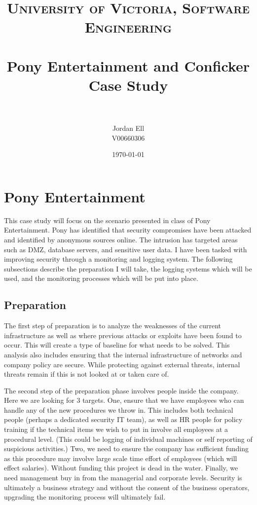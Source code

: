 \documentclass[paper=a4, fontsize=11pt]{scrartcl} %
\title{	
\normalfont \normalsize 
\textsc{University of Victoria, Software Engineering} \\ [25pt] %
\horrule{0.5pt} \\[0.4cm] %
\huge Pony Entertainment and Conficker Case Study \\ %
\horrule{2pt} \\[0.5cm] %
}
\author{Jordan Ell \\ V00660306} %
\date{\normalsize\today} %
\numberwithin{equation}{section} %
\numberwithin{figure}{section} %
\numberwithin{table}{section} %
\begin{document}
\maketitle %


\section{Pony Entertainment}
This case study will focus on the scenario presented in class of Pony Entertainment. Pony
has identified that security compromises have been attacked and identified by anonymous
sources online. The intrusion has targeted areas such as DMZ, database servers, and
sensitive user data. I have been tasked with improving security through a monitoring and
logging system. The following subsections describe the preparation I will take, the
logging systems which will be used, and the monitoring processes which will be put into
place.


\subsection{Preparation}
The first step of preparation is to analyze the weaknesses of the current infrastructure
as well as where previous attacks or exploits have been found to occur. This will create
a type of baseline for what needs to be solved. This analysis also includes ensuring
that the internal infrastructure of networks and company policy are secure. While
protecting against external threats, internal threats remain if this is not looked at
or taken care of.

The second step of the preparation phase involves people inside the company. Here we
are looking for 3 targets. One, ensure that we have employees who can handle any of 
the new procedures we throw in. This includes both technical people (perhaps a dedicated
security IT team), as well as HR people for policy training if the technical items
we wish to put in involve all employees at a procedural level. (This could be logging
of individual machines or self reporting of suspicious activities.) Two, we need to 
ensure the company has sufficient funding as this procedure may involve large scale time
effort of employees (which will effect salaries). Without funding this project is dead
in the water. Finally, we need management buy in from the managerial and corporate
levels. Security is ultimately a business strategy and without the consent of the
business operators, upgrading the monitoring process will ultimately fail.
\end{document}
